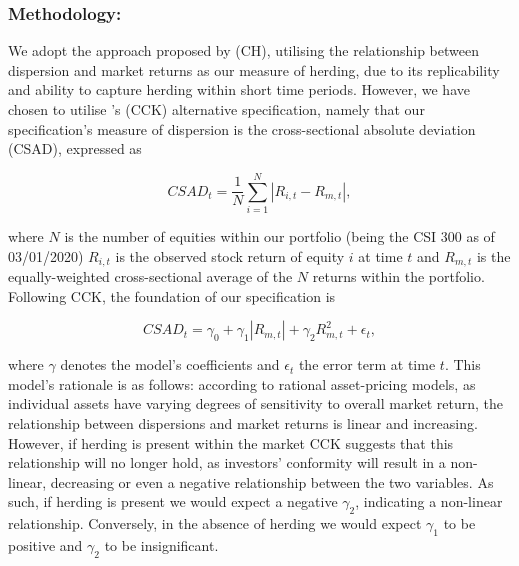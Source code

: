 \documentclass[12pt]{article}
\numberwithin{table}{section}   %
\begin{document}
\subsubsection*{Methodology:}

We adopt the approach proposed by \citet{ch} (CH), utilising the relationship between dispersion and market returns as our measure of herding, due to its replicability and ability to capture herding within short time periods. However, we have chosen to utilise \citet{cck}'s (CCK) alternative specification, namely that our specification’s measure of dispersion is the cross-sectional absolute deviation (CSAD), expressed as

$$
CSAD_t=\frac{1}{N}\sum^N_{i=1}|R_{i,t}-R_{m,t}|,
$$

where $N$ is the number of equities within our portfolio (being the CSI 300 as of 03/01/2020) $R_{i,t}$ is the observed stock return of equity $i$ at time $t$ and $R_{m,t}$ is the equally-weighted cross-sectional average of the $N$ returns within the portfolio. Following CCK, the foundation of our specification is

$$
CSAD_t=\gamma_0+\gamma_1 |R_{m,t}|+\gamma_2 R_{m,t}^2+\epsilon_t,
$$

where $\gamma$ denotes the model’s coefficients and $\epsilon_t$ the error term at time $t$. This model’s rationale is as follows: according to rational asset-pricing models, as individual assets have varying degrees of sensitivity to overall market return, the relationship between dispersions and market returns is linear and increasing. However, if herding is present within the market CCK suggests that this relationship will no longer hold, as investors’ conformity will result in a non-linear, decreasing or even a negative relationship between the two variables. As such, if herding is present we would expect a negative $\gamma_2$, indicating a non-linear relationship. Conversely, in the absence of herding we would expect $\gamma_1$ to be positive and $\gamma_2$ to be insignificant.
\end{document}
